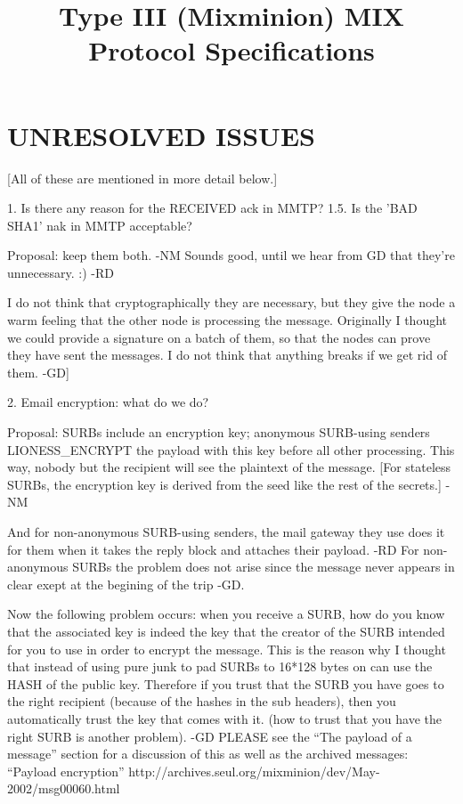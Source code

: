 \title{Type III (Mixminion) MIX Protocol Specifications}

\section{UNRESOLVED ISSUES}

[All of these are mentioned in more detail below.]


1. Is there any reason for the RECEIVED ack in MMTP?
1.5. Is the 'BAD SHA1' nak in MMTP acceptable?

   Proposal: keep them both. -NM
   Sounds good, until we hear from GD that they're unnecessary. :) -RD

   I do not think that cryptographically they are necessary, but they
   give the node a warm feeling that the other node is processing the
   message. Originally I thought we could provide a signature on a
   batch of them, so that the nodes can prove they have sent the
   messages. I do not think that anything breaks if we get rid of
   them. -GD]
 

2. Email encryption: what do we do?

   Proposal: SURBs include an encryption key; anonymous SURB-using
   senders LIONESS_ENCRYPT the payload with this key before all other
   processing.  This way, nobody but the recipient will see the
   plaintext of the message. [For stateless SURBs, the encryption key
   is derived from the seed like the rest of the secrets.] -NM

   And for non-anonymous SURB-using senders, the mail gateway they
   use does it for them when it takes the reply block and attaches their
   payload. -RD
   For non-anonymous SURBs the problem does not arise since the
   message never appears in clear exept at the begining of the trip
   -GD.

   Now the following problem occurs: when you receive a SURB, how do
   you know that the associated key is indeed the key that the creator
   of the SURB intended for you to use in order to encrypt the
   message. This is the reason why I thought that instead of using
   pure junk to pad SURBs to 16*128 bytes on can use the HASH of the
   public key. Therefore if you trust that the SURB you have goes to
   the right recipient (because of the hashes in the sub headers), 
   then you automatically trust the key that
   comes with it. (how to trust that you have the right SURB is
   another problem). -GD
   PLEASE see the ``The payload of a message'' section for a
   discussion of this as well as the archived messages:
   ``Payload encryption''
   http://archives.seul.org/mixminion/dev/May-2002/msg00060.html

